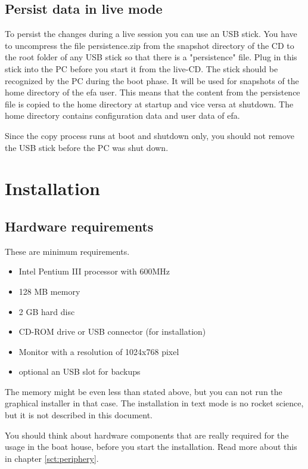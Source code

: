 \documentclass[a4paper,12pt,twoside]{article}
\begin{document}
\subsection{Persist data in live mode}
\label{sct:live_persist}
To persist the changes during a live session you can use an USB stick.
You have to uncompress the file persistence.zip from the snapshot
directory of the CD to the root folder of any USB stick so that there
is a "persistence" file. Plug in this stick
into the PC before you start it from the live-CD. The stick should be
recognized by the PC during the boot phase. It will be used for
snapshots of the home directory of the efa user. This means that the
content from the persistence file is copied to the home directory at
startup and vice versa at shutdown. The home directory contains
configuration data and user data of efa.

Since the copy process runs at boot and shutdown only, you should not
remove the USB stick before the PC was shut down.


\section{Installation}
\label{sct:installation}
\subsection{Hardware requirements}
\label{sct:inst_hardware}
These are minimum requirements.

\begin{itemize}
    \item Intel Pentium III processor with 600MHz
    \item 128 MB memory
    \item 2 GB hard disc
    \item CD-ROM drive or USB connector (for installation)
    \item Monitor with a resolution of 1024x768 pixel
    \item optional an USB slot for backups
\end{itemize}

The memory might be even less than stated above, but you can not run the
graphical installer in that case. The installation in text mode is no
rocket science, but it is not described in this document.

You should think about hardware components that are really required for
the usage in the boat house, before you start the installation. Read
more about this in chapter \ref{sct:periphery}.
\end{document}
